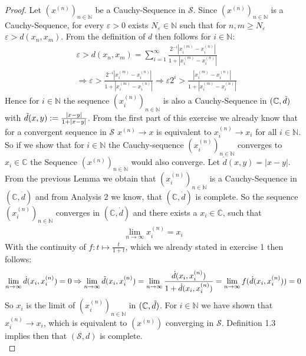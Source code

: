 \documentclass[a4paper]{article}
\renewcommand{\hline}{\noindent\makebox[\linewidth]{\rule{12cm}{1pt}}}
\newcommand{\N}{\mathbb{N}} %
\newcommand{\C}{\mathbb{C}} %
\begin{document}
\begin{proof}
 Let $(x^{(n)})_{n \in \N}$ be a Cauchy-Sequence in $\mathcal{S}$.
Since $(x^{(n)})_{n \in \N}$ is a Cauchy-Sequence, for every $\varepsilon > 0$ exists $N_{\varepsilon} \in \N$ such that for $n,m \geq N_{\varepsilon}$ $\varepsilon > d(x_n,x_m) $. From the definition of $d$ then follows for $i \in \N$: 
\begin{align*}
    & \varepsilon > d(x_n,x_m) = \sum_{i = 1}^{\infty} \frac{2^{-i} |x_i^{(m)} -  x_i^{(n)}|}{1+ |x_i^{(m)} -  x_i^{(n)}|} \\
    & \Rightarrow \varepsilon > \frac{2^{-i} |x_i^{(m)} -  x_i^{(n)}|}{1+ |x_i^{(m)} -  x_i^{(n)}|} \Rightarrow \varepsilon 2^{i} > \frac{|x_i^{(m)} -  x_i^{(n)}|}{1+ |x_i^{(m)} -  x_i^{(n)}|}
\end{align*}
Hence for $i \in \N$ the sequence $(x_i^{(n)})_{n \in \N}$ is also a Cauchy-Sequence in $(\C, \Tilde{d})$ with $\Tilde{d}(x,y): = \frac{|x-y|}{1 + |x-y|} $. 
From the first part of this exercise we already know that for a convergent sequence in $\mathcal{S}$ $x^{(n)} \to x$ is equivalent to $x_i^{(n)} \to x_i$ for all $i \in \N$. So if we show that for $i \in \N$ the Cauchy-sequence $(x_i^{(n)})_{n \in \N}$ converges to $x_i \in \C$ the Sequence $(x^{(n)})_{n \in \N}$ would also converge. Let $\Dot{d}(x,y) = |x-y|$.
From the previous Lemma we obtain that  $(x_i^{(n)})_{n \in \N}$ is a Cauchy-Sequence in $(\C, \Dot{d})$ and from Analysis 2 we know, that $(\C, \Dot{d})$ is complete. So the sequence $(x_i^{(n)})_{n \in \N}$ converges in $(\C, \Dot{d})$ and there exists a $x_i \in \C$, such that 
\begin{align*}
    \lim_{n \to \infty} x_i^{(n)} = x_i
\end{align*}
With the continuity of $f: t \mapsto \frac{t}{1+t}$, which we already stated in exercise 1 then follows: 
\begin{align*}
    \lim_{n \to \infty} \Dot{d}(x_i,x_i^{(n)}) = 0
    \Rightarrow \lim_{n \to \infty} \Tilde{d}(x_i,x_i^{(n)}) = \lim_{n \to \infty } \frac{\Dot{d}(x_i,x_i^{(n)})}{1+ \Dot{d}(x_i,x_i^{(n)})} = 
    \lim_{n \to \infty } f(\Dot{d}(x_i,x_i^{(n)})) = 0 
\end{align*}
So $x_i$ is the limit of $(x_i^{(n)})_{n \in \N}$ in $(\C, \Tilde{d})$. For $i \in \N$ we have shown that $x_i^{(n)} \to x_i$, which is equivalent to $(x^{(n)})$ converging in $\mathcal{S}$. Definition 1.3 implies then that $(\mathcal{S},d) $ is complete.\\
\end{proof}
\hline
\end{document}
